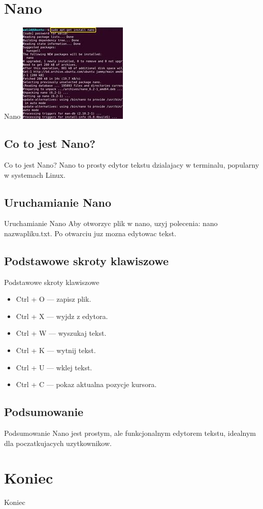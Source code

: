 \documentclass{beamer}
\begin{document}
\section{Nano}
\begin{frame}{Nano}
\centering
\includegraphics{nano.png}
\end{frame}

\subsection{Co to jest Nano?}
\begin{frame}{Co to jest Nano?}
Nano to prosty edytor tekstu dzialajacy w terminalu, popularny w systemach Linux.
\end{frame}

\subsection{Uruchamianie Nano}
\begin{frame}{Uruchamianie Nano}
Aby otworzyc plik w nano, uzyj polecenia:
nano nazwapliku.txt.
Po otwarciu juz mozna edytowac tekst.
\end{frame}

\subsection{Podstawowe skroty klawiszowe}
\begin{frame}{Podstawowe skroty klawiszowe}
\begin{itemize}
\item Ctrl + O   — zapisz plik.
\item Ctrl + X   — wyjdz z edytora. 
\item Ctrl + W   — wyszukaj tekst.
\item Ctrl + K   — wytnij tekst.
\item Ctrl + U   — wklej tekst.
\item Ctrl + C   — pokaz aktualna pozycje kursora.
\end{itemize}
\end{frame}

\subsection{Podsumowanie}
\begin{frame}{Podsumowanie}
Nano jest prostym, ale funkcjonalnym edytorem tekstu, idealnym dla poczatkujacych uzytkownikow.
\end{frame}


\section{Koniec}
\begin{frame}
\centering
Koniec
\end{frame}
\end{document}
